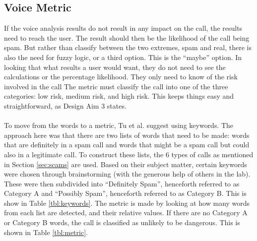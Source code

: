 \documentclass[main.tex]{subfiles}
\begin{document}
\subsection{Voice Metric}
If the voice analysis results do not result in any impact on the call, the results need to reach the user. The result should then be the likelihood of the call being spam. But rather than classify between the two extremes, spam and real, there is also the need for fuzzy logic, or a third option. This is the ``maybe'' option. In looking that what results a user would want, they do not need to see the calculations or the percentage likelihood. They only need to know of the risk involved in the call The metric must classify the call into one of the three categories: low risk, medium risk, and high risk. This keeps things easy and straightforward, as Design Aim 3 states.
\\\\
To move from the words to a metric, Tu et al. \cite{cisco} suggest using keywords. The approach here was that there are two lists of words that need to be made: words that are definitely in a spam call and words that might be a spam call but could also in a legitimate call. To construct these lists, the 6 types of calls as mentioned in Section \ref{sec:scams} are used. Based on their subject matter, certain keywords were chosen through brainstorming (with the generous help of others in the lab). These were then subdivided into ``Definitely Spam'', henceforth referred to as Category A and ``Possibly Spam'', henceforth referred to as Category B. This is show in Table \ref{tbl:keywords}. The metric is made by looking at how many words from each list are detected, and their relative values. If there are no Category A or Category B words, the call is classified as unlikely to be dangerous. This is shown in Table \ref{tbl:metric}.
\end{document}
